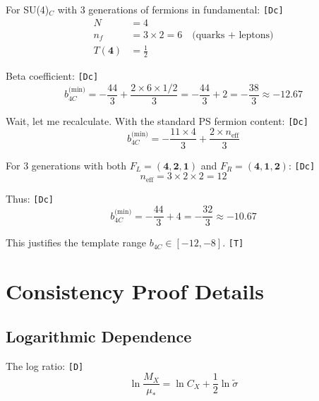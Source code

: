 \documentclass[11pt,a4paper]{article}
\newcommand{\tagD}{\textcolor{green!50!black}{\texttt{[D]}}}
\newcommand{\tagDc}{\textcolor{blue!70!black}{\texttt{[Dc]}}}
\newcommand{\tagT}{\textcolor{cyan!70!black}{\texttt{[T]}}}
\theoremstyle{definition}
\begin{document}
For SU(4)$_C$ with 3 generations of fermions in fundamental: \tagDc{}
\begin{align}
\label{eq:app-su4-1}
N &= 4 \\
\label{eq:app-su4-2}
n_f &= 3 \times 2 = 6 \quad \text{(quarks + leptons)} \\
\label{eq:app-su4-3}
T(\mathbf{4}) &= \frac{1}{2}
\end{align}

Beta coefficient: \tagDc{}
\begin{equation}
\label{eq:app-su4-beta}
b_{4C}^{\text{(min)}} = -\frac{44}{3} + \frac{2 \times 6 \times 1/2}{3} = -\frac{44}{3} + 2 = -\frac{38}{3} \approx -12.67
\end{equation}

Wait, let me recalculate. With the standard PS fermion content: \tagDc{}
\begin{equation}
\label{eq:app-su4-recount}
b_{4C}^{\text{(min)}} = -\frac{11 \times 4}{3} + \frac{2 \times n_{\text{eff}}}{3}
\end{equation}

For 3 generations with both $F_L = (\mathbf{4}, \mathbf{2}, \mathbf{1})$ and
$F_R = (\mathbf{4}, \mathbf{1}, \mathbf{2})$: \tagDc{}
\begin{equation}
\label{eq:app-neff}
n_{\text{eff}} = 3 \times 2 \times 2 = 12
\end{equation}

Thus: \tagDc{}
\begin{equation}
\label{eq:app-su4-final}
b_{4C}^{\text{(min)}} = -\frac{44}{3} + 4 = -\frac{32}{3} \approx -10.67
\end{equation}

This justifies the template range $b_{4C} \in [-12, -8]$. \tagT{}

\section{Consistency Proof Details}
\label{app:consistency}

\subsection{Logarithmic Dependence}
\label{app:log-dep}

The log ratio: \tagD{}
\begin{equation}
\label{eq:app-log-1}
\ln\frac{M_X}{\mu_*} = \ln C_X + \frac{1}{2}\ln\tilde{\sigma}
\end{equation}
\end{document}
